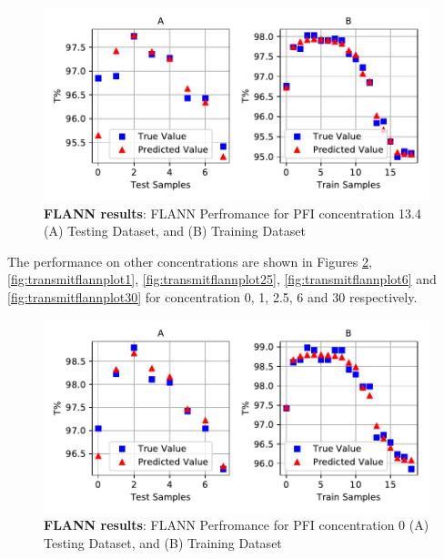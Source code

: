 \documentclass[]{article}
\begin{document}
\begin{figure}
\centering
\includegraphics{Report_files/figure-latex/transmitflannplot134-1.pdf}
\caption{\label{fig:transmitflannplot134}\textbf{FLANN results}: FLANN Perfromance for PFI concentration 13.4 (A) Testing Dataset, and (B) Training Dataset}
\end{figure}

The performance on other concentrations are shown in Figures \ref{fig:transmitflannplot0}, \ref{fig:transmitflannplot1}, \ref{fig:transmitflannplot25}, \ref{fig:transmitflannplot6} and \ref{fig:transmitflannplot30} for concentration 0, 1, 2.5, 6 and 30 respectively.

\begin{figure}
\centering
\includegraphics{Report_files/figure-latex/transmitflannplot0-1.pdf}
\caption{\label{fig:transmitflannplot0}\textbf{FLANN results}: FLANN Perfromance for PFI concentration 0 (A) Testing Dataset, and (B) Training Dataset}
\end{figure}
\end{document}
